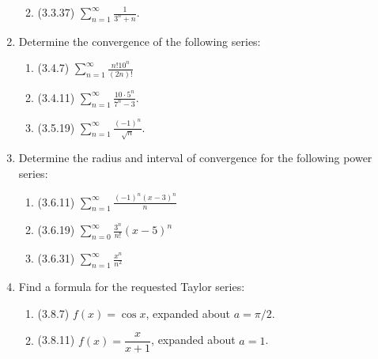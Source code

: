 \documentclass[12pt]{article}
\newcommand{\di}{\displaystyle}
\begin{document}
\begin{enumerate}
\begin{enumerate}
\vspace{1.7in}

\item (3.3.37) $\di \sum_{n=1}^\infty \frac{1}{3^n+n}$.
\end{enumerate}
\newpage


\item Determine the convergence of the following series:
\begin{enumerate}
\item (3.4.7) $\di \sum_{n=1}^\infty \frac{n!10^n}{(2n)!}$

\vspace{2.5in}

\item (3.4.11) $\di \sum_{n=1}^\infty \frac{10\cdot 5^n}{7^n-3}$.

\vspace{2.5in}

\item (3.5.19) $\di \sum_{n=1}^\infty \frac{(-1)^n}{\sqrt{n}}$.
\end{enumerate}

\newpage

\item Determine the radius and interval of convergence for the following power series:
\begin{enumerate}
\item (3.6.11) $\di \sum_{n=1}^\infty \frac{(-1)^n(x-3)^n}{n}$

\vspace{2.5in}

\item (3.6.19) $\di \sum_{n=0}^\infty \frac{3^n}{n!}(x-5)^n$

\vspace{2.5in}

\item (3.6.31) $\di \sum_{n=1}^\infty \frac{x^n}{n^2}$
\end{enumerate}
\newpage

\item Find a formula for the requested Taylor series:
\begin{enumerate}
\item (3.8.7) $f(x)=\cos x$, expanded about $a=\pi/2$.

\vspace{1.6in}

\item (3.8.11) $f(x)=\dfrac{x}{x+1}$, expanded about $a=1$.

\vspace{1.6in}


\end{enumerate}
\end{enumerate}
\end{document}
